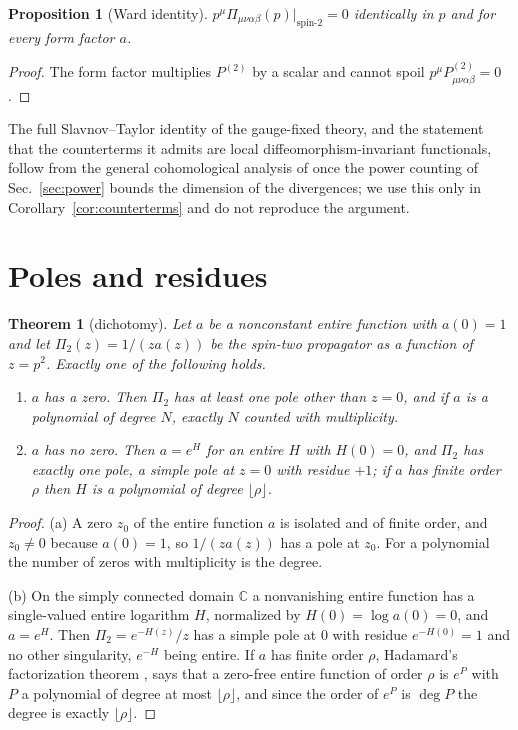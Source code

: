 \documentclass[aps,prd,10pt,twocolumn,superscriptaddress,nofootinbib,floatfix,longbibliography,showpacs,showkeys]{revtex4-2}
\theoremstyle{plain}
\newtheorem{theorem}{Theorem}
\newtheorem{proposition}{Proposition}
\theoremstyle{definition}
\theoremstyle{remark}
\newcommand{\bC}{\mathbb{C}}
\newcommand{\Pt}{P^{(2)}}
\begin{document}
\begin{proposition}[Ward identity]
\label{prop:ward}
$p^\mu\Pi_{\mu\nu\alpha\beta}(p)\big|_{\text{spin-}2}=0$ identically in $p$ and for every form factor $a$.
\end{proposition}

\begin{proof}
The form factor multiplies $\Pt$ by a scalar and cannot spoil $p^\mu\Pt_{\mu\nu\alpha\beta}=0$.
\end{proof}

The full Slavnov--Taylor identity of the gauge-fixed theory, and the statement that the counterterms it admits are local diffeomorphism-invariant functionals, follow from the general cohomological analysis of \cite{BarnichBrandtHenneaux2000} once the power counting of Sec.~\ref{sec:power} bounds the dimension of the divergences; we use this only in Corollary~\ref{cor:counterterms} and do not reproduce the argument.

\section{Poles and residues}
\label{sec:poles}

\begin{theorem}[dichotomy]
\label{thm:dichotomy}
Let $a$ be a nonconstant entire function with $a(0)=1$ and let $\Pi_2(z)=1/(za(z))$ be the spin-two propagator as a function of $z=p^2$. Exactly one of the following holds.
\begin{enumerate}[label=\textup{(\alph*)},leftmargin=2.2em,itemsep=0.1em]
\item $a$ has a zero. Then $\Pi_2$ has at least one pole other than $z=0$, and if $a$ is a polynomial of degree $N$, exactly $N$ counted with multiplicity.
\item $a$ has no zero. Then $a=e^{H}$ for an entire $H$ with $H(0)=0$, and $\Pi_2$ has exactly one pole, a simple pole at $z=0$ with residue $+1$; if $a$ has finite order $\rho$ then $H$ is a polynomial of degree $\lfloor\rho\rfloor$.
\end{enumerate}
\end{theorem}

\begin{proof}
(a) A zero $z_0$ of the entire function $a$ is isolated and of finite order, and $z_0\ne0$ because $a(0)=1$, so $1/(za(z))$ has a pole at $z_0$. For a polynomial the number of zeros with multiplicity is the degree.

(b) On the simply connected domain $\bC$ a nonvanishing entire function has a single-valued entire logarithm $H$, normalized by $H(0)=\log a(0)=0$, and $a=e^{H}$. Then $\Pi_2=e^{-H(z)}/z$ has a simple pole at $0$ with residue $e^{-H(0)}=1$ and no other singularity, $e^{-H}$ being entire. If $a$ has finite order $\rho$, Hadamard's factorization theorem \cite{Hadamard1893}, \cite[Chapter~XI]{Conway1978} says that a zero-free entire function of order $\rho$ is $e^{P}$ with $P$ a polynomial of degree at most $\lfloor\rho\rfloor$, and since the order of $e^{P}$ is $\deg P$ the degree is exactly $\lfloor\rho\rfloor$.
\end{proof}
\end{document}
